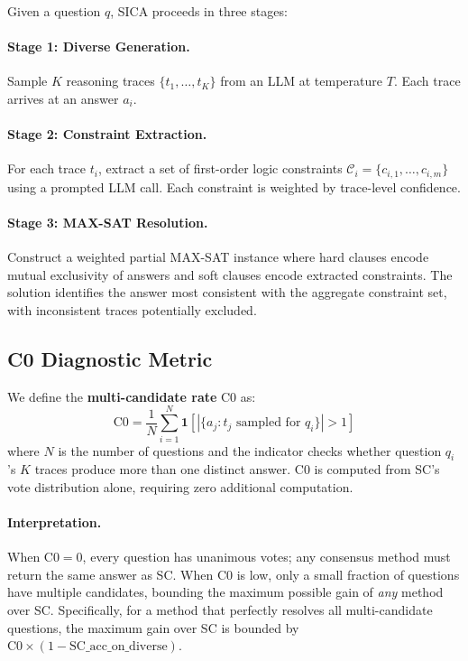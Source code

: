 \documentclass[11pt]{article}
\begin{document}
Given a question $q$, SICA proceeds in three stages:

\paragraph{Stage 1: Diverse Generation.} Sample $K$ reasoning traces $\{t_1, \ldots, t_K\}$ from an LLM at temperature $T$. Each trace arrives at an answer $a_i$.

\paragraph{Stage 2: Constraint Extraction.} For each trace $t_i$, extract a set of first-order logic constraints $\mathcal{C}_i = \{c_{i,1}, \ldots, c_{i,m}\}$ using a prompted LLM call. Each constraint is weighted by trace-level confidence.

\paragraph{Stage 3: MAX-SAT Resolution.} Construct a weighted partial MAX-SAT instance where hard clauses encode mutual exclusivity of answers and soft clauses encode extracted constraints. The solution identifies the answer most consistent with the aggregate constraint set, with inconsistent traces potentially excluded.

\subsection{C0 Diagnostic Metric}

We define the \textbf{multi-candidate rate} C0 as:
\begin{equation}
    \text{C0} = \frac{1}{N} \sum_{i=1}^{N} \mathbf{1}\left[|\{a_j : t_j \text{ sampled for } q_i\}| > 1\right]
\end{equation}
where $N$ is the number of questions and the indicator checks whether question $q_i$'s $K$ traces produce more than one distinct answer. C0 is computed from SC's vote distribution alone, requiring zero additional computation.

\paragraph{Interpretation.} When C0$=$0, every question has unanimous votes; any consensus method must return the same answer as SC. When C0 is low, only a small fraction of questions have multiple candidates, bounding the maximum possible gain of \emph{any} method over SC. Specifically, for a method that perfectly resolves all multi-candidate questions, the maximum gain over SC is bounded by $\text{C0} \times (1 - \text{SC\_acc\_on\_diverse})$.
\end{document}
